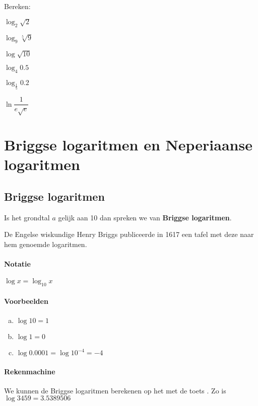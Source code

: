 \documentclass[12pt,twoside]{article}
\begin{document}
\begin{oefening}
Bereken:
\begin{exlist}{3}
  \item $\log_2 \sqrt{2}$
  \item $\log_9 \sqrt[5]{9}$
  \item $\log \sqrt{10}$
  \item $\log_4 0.5$
  \item $\log_{\frac{1}{5}} 0.2$
  \item $\ln \dfrac{1}{e\sqrt{e}}$
\end{exlist}
\end{oefening}

\pagebreak
\section{Briggse logaritmen en Neperiaanse logaritmen}

\subsection{Briggse logaritmen}

Is het grondtal $a$ gelijk aan 10 dan spreken we van {\bf Briggse logaritmen}.

De Engelse wiskundige Henry Briggs publiceerde in 1617 een tafel met deze naar hem genoemde logaritmen.

\paragraph{Notatie} $\log x = \log_{10} x$

\paragraph{Voorbeelden}\begin{minipage}[t]{\textwidth}
\begin{enumerate}[(a)]
  \item $\log 10 = 1$
  \item $\log 1 = 0$
  \item $\log 0.0001 = \log 10^{-4} = -4$
\end{enumerate}
\end{minipage}

\paragraph{Rekenmachine} We kunnen de Briggse logaritmen berekenen op het  met de toets . Zo is $\log 3459 = 3.5389506$
\end{document}
